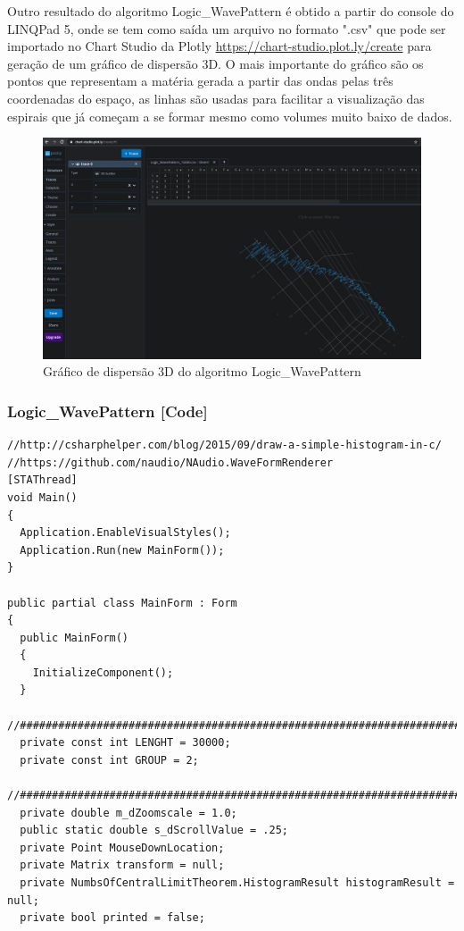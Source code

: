 \begin{apendicesenv}
Outro resultado do algoritmo Logic\_WavePattern é obtido a partir do console do LINQPad 5, onde se tem como saída um arquivo no formato ".csv" que pode ser importado no Chart Studio da Plotly \url{https://chart-studio.plot.ly/create} para geração de um gráfico de dispersão 3D. O mais importante do gráfico são os pontos que representam a matéria gerada a partir das ondas pelas três coordenadas do espaço, as linhas são usadas para facilitar a visualização das espirais que já começam a se formar mesmo como volumes muito baixo de dados. 
	\begin{figure}[H]
	\caption{Gráfico de dispersão 3D do algoritmo Logic\_WavePattern}
	\label{fig:plotly_3DScatter}
	\centering
	\includegraphics[scale=.33]{sections/images/plotly_3DScatter.jpg}
	\end{figure}

\subsubsection*{Logic\_WavePattern [Code]}
\begin{lstlisting}
//http://csharphelper.com/blog/2015/09/draw-a-simple-histogram-in-c/
//https://github.com/naudio/NAudio.WaveFormRenderer
[STAThread]
void Main()
{
  Application.EnableVisualStyles();
  Application.Run(new MainForm());
}

public partial class MainForm : Form
{
  public MainForm()
  {
    InitializeComponent();
  }
  //###########################################################################
  private const int LENGHT = 30000;
  private const int GROUP = 2;
  //###########################################################################
  private double m_dZoomscale = 1.0;
  public static double s_dScrollValue = .25;
  private Point MouseDownLocation;
  private Matrix transform = null;
  private NumbsOfCentralLimitTheorem.HistogramResult histogramResult = null;
  private bool printed = false;


\end{lstlisting}
\end{apendicesenv}
